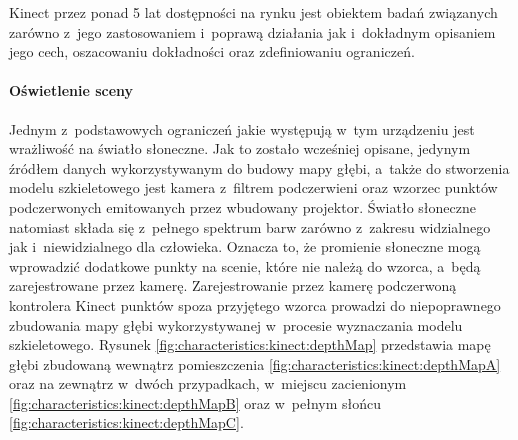 Kinect przez ponad 5 lat dostępności na rynku jest obiektem badań związanych zarówno z~jego zastosowaniem i~poprawą działania jak i~dokładnym opisaniem jego cech, oszacowaniu dokładności oraz zdefiniowaniu ograniczeń. 
																																	
\paragraph*{Oświetlenie sceny}
Jednym z~podstawowych ograniczeń jakie występują w~tym urządzeniu jest wrażliwość na światło słoneczne. Jak to zostało wcześniej opisane, jedynym źródłem danych wykorzystywanym do budowy mapy głębi, a~także do stworzenia modelu szkieletowego jest kamera z~filtrem podczerwieni oraz wzorzec punktów podczerwonych emitowanych przez wbudowany projektor. Światło słoneczne natomiast składa się z~pełnego spektrum barw zarówno z~zakresu widzialnego jak i~niewidzialnego dla człowieka. Oznacza to, że promienie słoneczne mogą wprowadzić dodatkowe punkty na scenie, które nie należą do wzorca, a~będą zarejestrowane przez kamerę. Zarejestrowanie przez kamerę podczerwoną kontrolera Kinect punktów spoza przyjętego wzorca prowadzi do niepoprawnego zbudowania mapy głębi wykorzystywanej w~procesie wyznaczania modelu szkieletowego. Rysunek \ref{fig:characteristics:kinect:depthMap} przedstawia mapę głębi zbudowaną wewnątrz pomieszczenia \ref{fig:characteristics:kinect:depthMapA} oraz na zewnątrz w~dwóch przypadkach, w~miejscu zacienionym \ref{fig:characteristics:kinect:depthMapB} oraz w~pełnym słońcu \ref{fig:characteristics:kinect:depthMapC}. 
																																	
